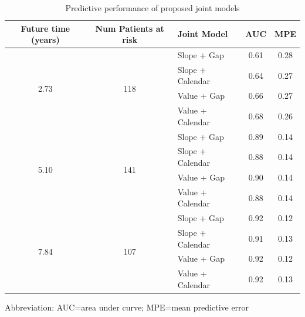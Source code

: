 \begin{table}[H]
  \small\sf\centering
  \captionsetup{justification=centering}
\caption{Predictive performance of proposed joint models}
\label{tab:myauc}
\begin{threeparttable}
\begin{tabular}{c|c|l|c|c}
\toprule
\textbf{Future time (years)} & \textbf{Num Patients at risk} & \textbf{Joint Model} & \textbf{AUC} & \textbf{MPE} \\ \hline
\multirow{4}{*}{2.73} & \multirow{4}{*}{118} & Slope + Gap & 0.61 &	0.28 \\
                      &                      & Slope + Calendar & 0.64 & 0.27 \\
                      &                      & Value + Gap & 0.66 & 0.27 \\
                      &                      & Value + Calendar & 0.68 & 0.26 \\ \cline{1-5}
\multirow{4}{*}{5.10} & \multirow{4}{*}{141} & Slope + Gap &	0.89 & 0.14 \\
                     &                      & Slope + Calendar & 0.88 & 0.14 \\
                     &                      & Value + Gap & 0.90 & 0.14 \\
                     &                      & Value + Calendar & 0.88 &	0.14\\ \cline{1-5}
\multirow{4}{*}{7.84} & \multirow{4}{*}{107} & Slope + Gap & 0.92 &	0.12 \\
                      &                      & Slope + Calendar & 0.91 & 0.13 \\
                      &                      & Value + Gap & 0.92 &	0.12 \\
                      &                      & Value + Calendar & 0.92 & 0.13\\ 
\bottomrule
\end{tabular}
\begin{tablenotes}[para]
\footnotesize
Abbreviation: AUC=area under curve; MPE=mean predictive error
\end{tablenotes}
\end{threeparttable}
\end{table}

